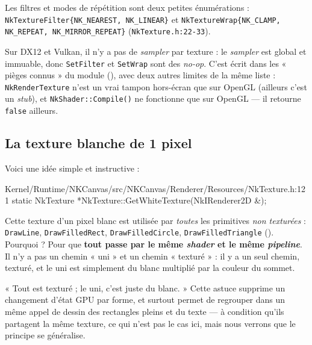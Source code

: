 Les filtres et modes de répétition sont deux petites énumérations :
\texttt{NkTextureFilter\{NK\_NEAREST, NK\_LINEAR\}} et
\texttt{NkTextureWrap\{NK\_CLAMP, NK\_REPEAT, NK\_MIRROR\_REPEAT\}}
(\texttt{NkTexture.h:22-33}).

\begin{nkpiege}
Sur DX12 et Vulkan, il n'y a pas de \emph{sampler} par texture : le
\emph{sampler} est global et immuable, donc \texttt{SetFilter} et
\texttt{SetWrap} sont des \emph{no-op}. C'est écrit dans les « pièges connus » du
module (), avec deux autres
limites de la même liste : \texttt{NkRenderTexture} n'est un vrai tampon
hors-écran que sur OpenGL (ailleurs c'est un \emph{stub}), et
\texttt{NkShader::Compile()} ne fonctionne que sur OpenGL — il retourne
\texttt{false} ailleurs.
\end{nkpiege}

\subsection{La texture blanche de 1 pixel}

Voici une idée simple et instructive :

\begin{nkcode}{Kernel/Runtime/NKCanvas/src/NKCanvas/Renderer/Resources/NkTexture.h:121}
static NkTexture *NkTexture::GetWhiteTexture(NkIRenderer2D &);
\end{nkcode}

Cette texture d'un pixel blanc est utilisée par \emph{toutes} les primitives
\emph{non texturées} : \texttt{DrawLine}, \texttt{DrawFilledRect},
\texttt{DrawFilledCircle}, \texttt{DrawFilledTriangle}
(). Pourquoi ?
Pour que \textbf{tout passe par le même \emph{shader} et le même
\emph{pipeline}}. Il n'y a pas un chemin « uni » et un chemin « texturé » : il y
a un seul chemin, texturé, et le uni est simplement du blanc multiplié par la
couleur du sommet.

\begin{nkretenir}
« Tout est texturé ; le uni, c'est juste du blanc. » Cette astuce supprime un
changement d'état GPU par forme, et surtout permet de regrouper dans un même
appel de dessin des rectangles pleins et du texte — à condition qu'ils partagent
la même texture, ce qui n'est pas le cas ici, mais nous verrons que le principe
se généralise.
\end{nkretenir}

